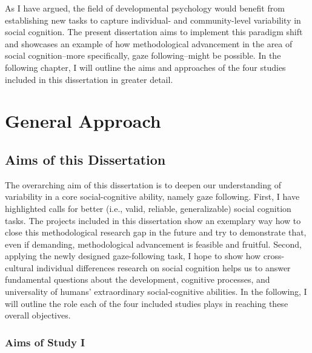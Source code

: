 \documentclass[
]{scrbook}
\begin{document}
As I have argued, the field of developmental psychology would benefit from establishing new tasks to capture individual- and community-level variability in social cognition. The present dissertation aims to implement this paradigm shift and showcases an example of how methodological advancement in the area of social cognition\thinspace --\thinspace more specifically, gaze following\thinspace --\thinspace might be possible. In the following chapter, I will outline the aims and approaches of the four studies included in this dissertation in greater detail.

\chapter{General Approach}\label{approach}

\section{Aims of this Dissertation}\label{aims-general}

The overarching aim of this dissertation is to deepen our understanding of variability in a core social-cognitive ability, namely gaze following. First, I have highlighted calls for better (i.e., valid, reliable, generalizable) social cognition tasks. The projects included in this dissertation show an exemplary way how to close this methodological research gap in the future and try to demonstrate that, even if demanding, methodological advancement is feasible and fruitful. Second, applying the newly designed gaze-following task, I hope to show how cross-cultural individual differences research on social cognition helps us to answer fundamental questions about the development, cognitive processes, and universality of humans' extraordinary social-cognitive abilities. In the following, I will outline the role each of the four included studies plays in reaching these overall objectives.

\subsection{Aims of Study I}\label{aims-studyI}
\end{document}
